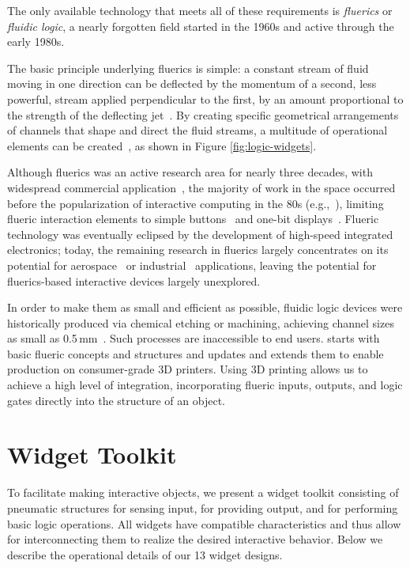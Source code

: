         The only available technology that meets all of these requirements
        is \textit{fluerics} or \textit{fluidic logic}, a nearly forgotten field
        started in the 1960s and active through the early 1980s.
        
        The basic principle underlying fluerics is simple: a constant stream
        of fluid moving in one direction can be deflected by the momentum
        of a second, less powerful, stream applied perpendicular to the
        first, by an amount proportional to the strength of the deflecting
        jet~\cite[p.~64]{CharlesBelsterling:1971}. By creating specific
        geometrical arrangements of channels that shape and direct the
        fluid streams, a multitude of operational elements can be
        created~\cite{Glaettli:1964}, as shown in Figure \ref{fig:logic-widgets}.
        
        Although fluerics was an active research area for nearly three
        decades, with widespread commercial application~\cite{:1968}, the
        majority of work in the space occurred before the popularization of
        interactive computing in the 80s (e.g.,~\cite{Foley:1984a}),
        limiting flueric interaction elements to simple
        buttons~\cite[p.~240]{:1968} and one-bit
        displays~\cite[p.698]{:1968}. Flueric technology was eventually
        eclipsed by the development of high-speed integrated electronics;
        today, the remaining research in fluerics largely concentrates on
        its potential for aerospace~\cite{Ferlauto:2017} or
        industrial~\cite{Lacarelle:2011} applications, leaving the
        potential for fluerics-based interactive devices largely
        unexplored.
        
        In order to make them as small and efficient as possible, fluidic
        logic devices were historically produced via chemical etching or
        machining, achieving channel sizes as small as
        0.5\,mm~\cite{Tanney:1970}. Such processes are inaccessible to end
        users. \al starts with basic flueric concepts and structures and
        updates and extends them to enable production on consumer-grade 3D
        printers. Using 3D printing allows us to achieve a high level of
        integration, incorporating flueric inputs, outputs, and logic gates
        directly into the structure of an object.

  \section{\al Widget Toolkit}
      To facilitate making \al interactive objects, we present a widget toolkit
      consisting of pneumatic structures for sensing input, for providing
      output, and for performing basic logic operations. All widgets have
      compatible characteristics and thus allow for interconnecting them to
      realize the desired interactive behavior. Below we describe the
      operational details of our 13 widget designs.
      
